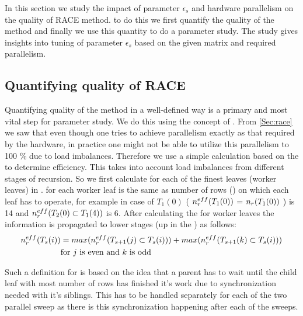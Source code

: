 
In this section we study the impact of parameter $\epsilon_s$ and hardware parallelism on the quality of  RACE method. \Inorder to do this we first quantify the quality of the method and finally we  use this quantity to do a parameter study. The study gives insights into tuning of parameter $\epsilon_s$ based on the given matrix and required parallelism.


\subsection{Quantifying quality of RACE}
Quantifying quality of the method in a well-defined way is a primary and most vital step for parameter study. We do this using the concept of \effPar. From \cref{Sec:race} we saw that even though one tries to achieve parallelism exactly as that required by the hardware, in practice one might not be able to utilize this parallelism to 100 \% due to load imbalances. Therefore we use a simple calculation based on the \levelTree to determine efficiency. This takes into account load imbalances from different stages of recursion. So we first calculate \effRow for each of the finest leaves (worker leaves) in \levelTree. \EffRow for each worker leaf is the same as number of rows (\nrows) on which each leaf has to operate, for example in case of $T_1(0)$ \effRow ( $n_{r}^{eff}(T_1(0))$ = $n_{r}(T_1(0))$ ) is 14 and $n_{r}^{eff}(T_2(0) \subset T_1(4))$ is 6. After calculating the \effRow for worker leaves the information is propagated to lower stages (up in the \levelTree) as follows: 
\begin{align*}
n_{r}^{eff}(T_s(i)) &= max(n_{r}^{eff}(T_{s+1}(j) \subset T_s(i))) + max(n_{r}^{eff}(T_{s+1}(k) \subset T_s(i)))\\
 & \text{for } j \text{ is even and } k \text{ is odd}
\end{align*}

Such a definition for \effRow is based on the idea that a parent has to wait until the child leaf with most number of rows has finished it's work due to synchronization needed with it's siblings. This has to be handled separately for each of the two parallel sweep as there is this synchronization happening after each of the sweeps. 

